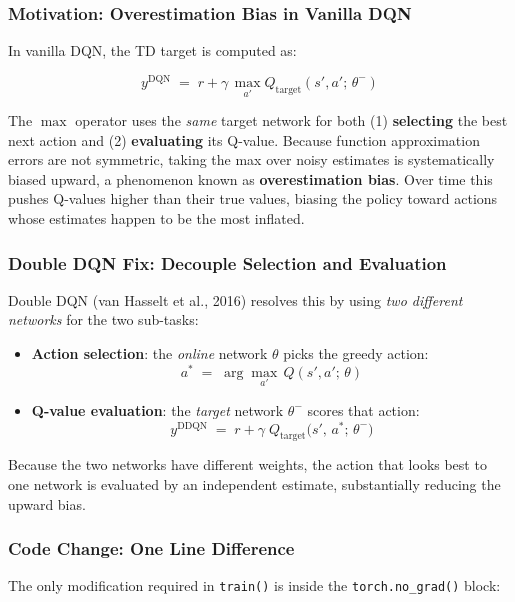 \documentclass[12pt,a4paper]{report}
\begin{document}
\subsubsection*{Motivation: Overestimation Bias in Vanilla DQN}

In vanilla DQN, the TD target is computed as:

\begin{equation}
  y^{\text{DQN}} \;=\; r + \gamma\,\max_{a'} Q_{\text{target}}(s', a';\,\theta^-)
\end{equation}

The $\max$ operator uses the \emph{same} target network for both
(1) \textbf{selecting} the best next action and
(2) \textbf{evaluating} its Q-value.
Because function approximation errors are not symmetric,
taking the max over noisy estimates is systematically biased upward,
a phenomenon known as \textbf{overestimation bias}.
Over time this pushes Q-values higher than their true values,
biasing the policy toward actions whose estimates happen to be the most inflated.

\subsubsection*{Double DQN Fix: Decouple Selection and Evaluation}

Double DQN (van Hasselt et al., 2016) resolves this by using \emph{two different networks}
for the two sub-tasks:

\begin{itemize}[leftmargin=1.8em]
  \item \textbf{Action selection}: the \emph{online} network $\theta$ picks the greedy action:
  \[
    a^* \;=\; \arg\max_{a'}\, Q(s', a';\,\theta)
  \]
  \item \textbf{Q-value evaluation}: the \emph{target} network $\theta^-$ scores that action:
  \[
    y^{\text{DDQN}} \;=\; r + \gamma\; Q_{\text{target}}\!\bigl(s',\, a^*;\,\theta^-\bigr)
  \]
\end{itemize}

Because the two networks have different weights, the action that looks best to one network
is evaluated by an independent estimate, substantially reducing the upward bias.

\subsubsection*{Code Change: One Line Difference}

The only modification required in \texttt{train()} is inside the \texttt{torch.no\_grad()} block:
\end{document}
